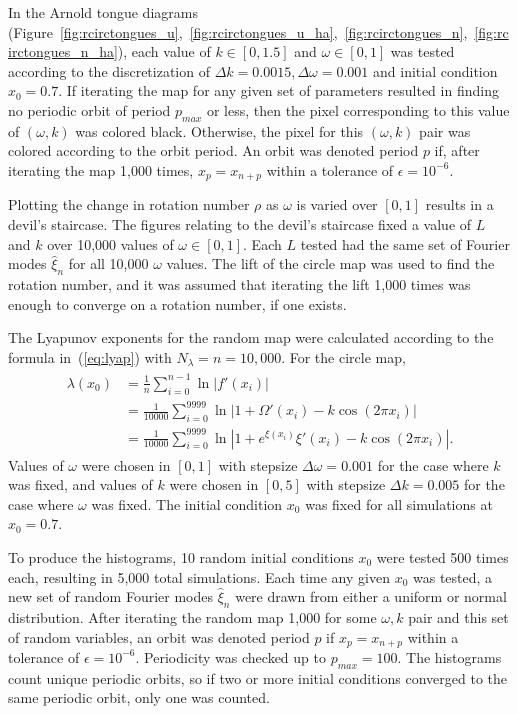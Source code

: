 In the Arnold tongue diagrams 
(Figure~\ref{fig:rcirctongues_u},~\ref{fig:rcirctongues_u_ha},~\ref{fig:rcirctongues_n},~\ref{fig:rcirctongues_n_ha}), each value of $k \in
[0,1.5]$ and $\omega \in [0,1]$ was tested according to the
discretization of $\Delta k=0.0015, \Delta \omega = 0.001$ and initial
condition $x_0=0.7$. If iterating the map for any given set of
parameters resulted in finding no periodic orbit of period $p_{max}$
or less, then the pixel corresponding to this value of $(\omega, k)$
was colored black. Otherwise, the pixel for this $(\omega, k)$ pair was colored
according to the orbit period. An orbit was
denoted period $p$ if, after iterating the map 1,000 times,
$x_p=x_{n+p}$ within a tolerance of $\epsilon = 10^{-6}$.

Plotting the change in rotation number $\rho$ as $\omega$ is varied over
$[0,1]$ results in a devil's staircase. The figures relating to the
devil's staircase fixed a value of $L$ and $k$ over 10,000 values of
$\omega \in [0,1]$. Each $L$ tested had the same set of Fourier
modes $\hat{\xi}_n$ for all 10,000 $\omega$ values. The lift of the circle map was used to find the
rotation number, and it was assumed that iterating the lift 1,000
times was enough to converge on a rotation number, if one exists. 

The Lyapunov exponents for the random map were calculated according to
the formula in~(\ref{eq:lyap}) with $N_\lambda=n=10,000$. For the circle map, 
\begin{align}
\begin{split}
\lambda(x_0) &= \frac{1}{n} \sum_{i=0}^{n-1} \ln |f'(x_i)|\\
&= \frac{1}{10000} \sum_{i=0}^{9999} \ln |1 + \Omega'(x_i) - k\cos(2\pi x_i)|\\
&= \frac{1}{10000} \sum_{i=0}^{9999} \ln |1+e^{\xi(x_i)}\xi'(x_i)- k\cos(2\pi x_i)|.
\end{split}
\end{align}
Values of $\omega$ were chosen in $[0,1]$ with stepsize $\Delta \omega
= 0.001$ for the case where $k$ was fixed, and values of $k$ were
chosen in $[0,5]$ with stepsize $\Delta k = 0.005$ for the case where
$\omega$ was fixed. The initial condition $x_0$ was fixed for all
simulations at $x_0=0.7$.

To produce the histograms, 10 random initial conditions $x_0$ were tested 500 times
each, resulting in 5,000 total simulations. Each time any given $x_0$
was tested, a new set of random Fourier modes $\hat{\xi}_n$ were drawn
from either a uniform or normal distribution. After iterating the random
map 1,000 for some $\omega,k$ pair and this set of random variables, an orbit was denoted period $p$ if $x_p = x_{n+p}$ within a
tolerance of $\epsilon = 10^{-6}$. Periodicity was checked up to
$p_{max}=100$. The histograms count unique periodic orbits, so if two
or more initial conditions converged to the same periodic orbit, only
one was counted. 
